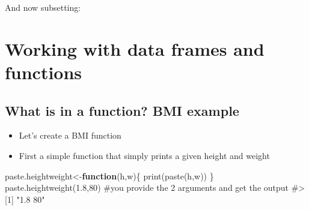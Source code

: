 \documentclass[
  letterpaper,
  DIV=11,
  numbers=noendperiod]{scrreprt}
\newenvironment{Shaded}{\begin{snugshade}}{\end{snugshade}}
\newcommand{\CommentTok}[1]{\textcolor[rgb]{0.37,0.37,0.37}{#1}}
\newcommand{\ControlFlowTok}[1]{\textcolor[rgb]{0.00,0.23,0.31}{\textbf{#1}}}
\newcommand{\DecValTok}[1]{\textcolor[rgb]{0.68,0.00,0.00}{#1}}
\newcommand{\FloatTok}[1]{\textcolor[rgb]{0.68,0.00,0.00}{#1}}
\newcommand{\FunctionTok}[1]{\textcolor[rgb]{0.28,0.35,0.67}{#1}}
\newcommand{\NormalTok}[1]{\textcolor[rgb]{0.00,0.23,0.31}{#1}}
\newcommand{\OtherTok}[1]{\textcolor[rgb]{0.00,0.23,0.31}{#1}}
\begin{document}
And now subsetting:

\begin{Shaded}
\end{Shaded}

\chapter{Working with data frames and
functions}\label{sec-working-with-data-frames-and-functions}

\section{What is in a function? BMI
example}\label{what-is-in-a-function-bmi-example}

\begin{itemize}
\item
  Let's create a BMI function
\item
  First a simple function that simply prints a given height and weight
\end{itemize}

\begin{Shaded}
\begin{Highlighting}[]
\NormalTok{paste.heightweight}\OtherTok{\textless{}{-}}\ControlFlowTok{function}\NormalTok{(h,w)\{}
  \FunctionTok{print}\NormalTok{(}\FunctionTok{paste}\NormalTok{(h,w))}
\NormalTok{  \}}
\FunctionTok{paste.heightweight}\NormalTok{(}\FloatTok{1.8}\NormalTok{,}\DecValTok{80}\NormalTok{) }\CommentTok{\#you provide the 2 arguments and get the output}
\CommentTok{\#\textgreater{} [1] "1.8 80"}
\end{Highlighting}
\end{Shaded}
\end{document}
